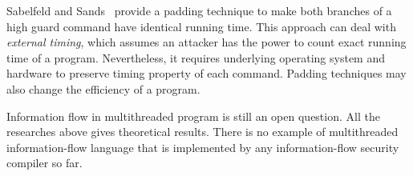 Sabelfeld and Sands~\cite{Sabelfeld:Sands:CSFW00} provide a padding
technique to make both branches of a high guard command have identical
running time. This approach can deal with {\em external timing}, which 
assumes an attacker has the power to count exact running time of a 
program. Nevertheless, it requires underlying operating system 
and hardware to preserve timing property of each command. Padding techniques
may also change the efficiency of a program.

Information flow in multithreaded program is still an open question.
All the researches above gives theoretical results.
There is no example of multithreaded information-flow language that is implemented 
by any information-flow security compiler so far.
